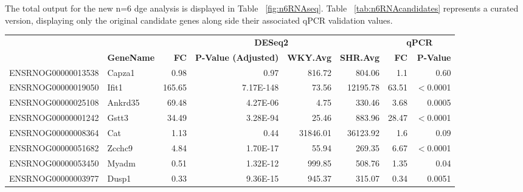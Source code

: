 The total output for the new n=6 \acrshort{dge} analysis is displayed in Table ~\ref{fig:n6RNAseq}. Table ~\ref{tab:n6RNAcandidates} represents a curated version, displaying only the original candidate genes along side their associated qPCR validation values.

\begin{sidewaystable}[!htbp]
\scriptsize
\centering
\begin{tabular}{llrrrr|rr}
                   &                   & \multicolumn{4}{c}{\textbf{DESeq2}}                                                                                    & \multicolumn{2}{c}{\textbf{qPCR}}\\
\textbf{}          & \textbf{GeneName} & \textbf{FC} & \textbf{P-Value (Adjusted)} & \textbf{WKY.Avg} & \textbf{SHR.Avg} &   \textbf{FC}  & \textbf{P-Value}\\
\hline
ENSRNOG00000013538 & Capza1            & 0.98                          & 0.97                        & 816.72                     & 804.06                     & 1.1   & 0.60 \\
ENSRNOG00000019050 & Ifit1             & 165.65                           & 7.17E-148                   & 73.56                      & 12195.78                   & 63.51 & $<$0.0001 \\
ENSRNOG00000025108 & Ankrd35           & 69.48                           & 4.27E-06                    & 4.75                       & 330.46                     & 3.68  & 0.0005\\
ENSRNOG00000001242 & Gstt3             & 34.49                           & 3.28E-94                    & 25.46                      & 883.96                     & 28.47 & $<$0.0001 \\
ENSRNOG00000008364 & Cat               & 1.13                           & 0.44                        & 31846.01                   & 36123.92                   & 1.6   & 0.09\\
ENSRNOG00000051682 & Zcchc9            & 4.84                           & 1.70E-17                    & 55.94                      & 269.35                     & 6.67  & $<$0.0001\\
\hline
ENSRNOG00000053450 & Myadm             & 0.51                          & 1.32E-12                    & 999.85                     & 508.76                     & 1.35  & 0.04\\
ENSRNOG00000003977 & Dusp1             & 0.33                          & 9.36E-15                    & 945.37                     & 315.07                     & 0.34  & 0.0051\\

\end{tabular}
\end{sidewaystable}
